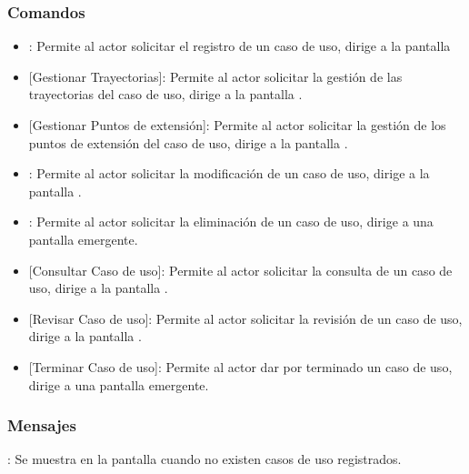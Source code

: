 \subsubsection{Comandos}
\begin{itemize}
	\item {}: Permite al actor solicitar el registro de un caso de uso, dirige a la pantalla 
	\item {} [Gestionar Trayectorias]: Permite al actor solicitar la gestión de las trayectorias del caso de
	uso, dirige a la pantalla .
	\item {} [Gestionar Puntos de extensión]: Permite al actor solicitar la gestión de los puntos de extensión del caso de uso, dirige a la pantalla .
	\item {}: Permite al actor solicitar la modificación de un caso de uso, dirige a la pantalla .
	\item {}: Permite al actor solicitar la eliminación de un caso de uso, dirige a una pantalla emergente.
	\item {} [Consultar Caso de uso]: Permite al actor solicitar la consulta de un caso de uso, dirige a la pantalla .\\
	\item {} [Revisar Caso de uso]: Permite al actor solicitar la revisión de un caso de uso, dirige a la pantalla .
	\item {} [Terminar Caso de uso]: Permite al actor dar por terminado un caso de uso, dirige a una pantalla emergente.
\end{itemize}

\subsubsection{Mensajes}

\begin{Citemize}
	\item {}: Se muestra en la pantalla  cuando no existen casos de uso registrados.
\end{Citemize}
